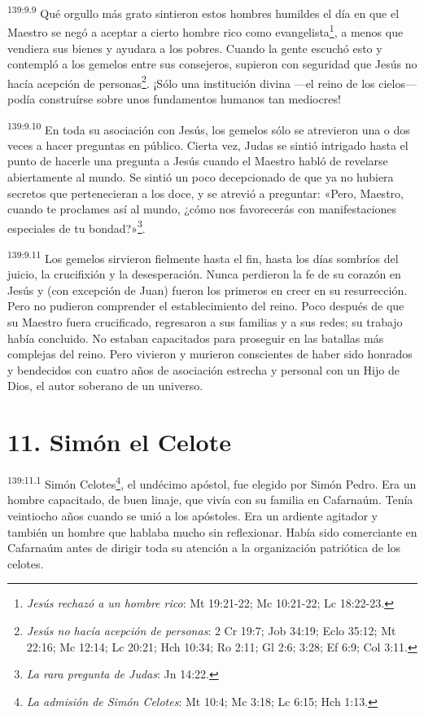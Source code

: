 \par
\textsuperscript{139:9.9} Qué orgullo más grato sintieron estos hombres humildes el día en que el Maestro se negó a aceptar a cierto hombre rico como evangelista\footnote{\textit{Jesús rechazó a un hombre rico}: Mt 19:21-22; Mc 10:21-22; Lc 18:22-23.}, a menos que vendiera sus bienes y ayudara a los pobres. Cuando la gente escuchó esto y contempló a los gemelos entre sus consejeros, supieron con seguridad que Jesús no hacía acepción de personas\footnote{\textit{Jesús no hacía acepción de personas}: 2 Cr 19:7; Job 34:19; Eclo 35:12; Mt 22:16; Mc 12:14; Lc 20:21; Hch 10:34; Ro 2:11; Gl 2:6; 3:28; Ef 6:9; Col 3:11.}. ¡Sólo una institución divina ---el reino de los cielos--- podía construírse sobre unos fundamentos humanos tan mediocres!

\par
\textsuperscript{139:9.10} En toda su asociación con Jesús, los gemelos sólo se atrevieron una o dos veces a hacer preguntas en público. Cierta vez, Judas se sintió intrigado hasta el punto de hacerle una pregunta a Jesús cuando el Maestro habló de revelarse abiertamente al mundo. Se sintió un poco decepcionado de que ya no hubiera secretos que pertenecieran a los doce, y se atrevió a preguntar: «Pero, Maestro, cuando te proclames así al mundo, ¿cómo nos favorecerás con manifestaciones especiales de tu bondad?»\footnote{\textit{La rara pregunta de Judas}: Jn 14:22.}.

\par
\textsuperscript{139:9.11} Los gemelos sirvieron fielmente hasta el fin, hasta los días sombríos del juicio, la crucifixión y la desesperación. Nunca perdieron la fe de su corazón en Jesús y (con excepción de Juan) fueron los primeros en creer en su resurrección. Pero no pudieron comprender el establecimiento del reino. Poco después de que su Maestro fuera crucificado, regresaron a sus familias y a sus redes; su trabajo había concluido. No estaban capacitados para proseguir en las batallas más complejas del reino. Pero vivieron y murieron conscientes de haber sido honrados y bendecidos con cuatro años de asociación estrecha y personal con un Hijo de Dios, el autor soberano de un universo.

\section*{11. Simón el Celote}
\par
\textsuperscript{139:11.1} Simón Celotes\footnote{\textit{La admisión de Simón Celotes}: Mt 10:4; Mc 3:18; Lc 6:15; Hch 1:13.}, el undécimo apóstol, fue elegido por Simón Pedro. Era un hombre capacitado, de buen linaje, que vivía con su familia en Cafarnaúm. Tenía veintiocho años cuando se unió a los apóstoles. Era un ardiente agitador y también un hombre que hablaba mucho sin reflexionar. Había sido comerciante en Cafarnaúm antes de dirigir toda su atención a la organización patriótica de los celotes.

